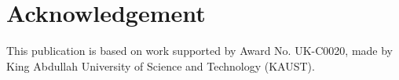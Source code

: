 \documentclass{llncs}
\begin{document}






% 




\section*{Acknowledgement}
This publication is based on work supported by Award No. UK-C0020, made by King Abdullah University of Science and Technology (KAUST).




\end{document}
